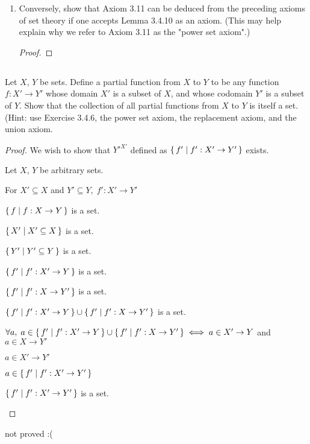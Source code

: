 \documentclass[../../main.tex]{subfiles}
\begin{document}
\begin{enumerate}
    \item 
    \begin{q}
        Conversely, show that Axiom 3.11 can be deduced from the preceding axioms of set theory if one accepts Lemma 3.4.10 as an axiom. (This may help explain why we refer to Axiom 3.11 as the "power set axiom".)
    \end{q}
    
    \begin{proof}
            
    \end{proof}        
\end{enumerate} 

\subsection{}
\begin{q}
    Let $X$, $Y$ be sets. Define a partial function from $X$ to $Y$ to be any function $f : X' \to Y'$ whose domain $X'$ is a subset of $X$, and whose codomain $Y'$ is a subset of $Y$. Show that the collection of all partial functions from $X$ to $Y$ is itself a set. (Hint: use Exercise 3.4.6, the power set axiom, the replacement axiom, and the union axiom.
\end{q}

\begin{proof}
    We wish to show that $Y'^{X'}$ defined as $\{\,f'\mid f' : X' \to Y'\,\}$ exists.
\begin{linebyline}
    \item Let $X$, $Y$ be arbitrary sets.
    \item For $X' \subseteq X$ and $Y' \subseteq Y, \; f' : X' \to Y'$
    \item $\{\,f\mid f : X \to Y\,\}$ is a set. 
    \item $\{\,X'\mid X' \subseteq X\,\}$ is a set. 
    \item $\{\,Y'\mid Y' \subseteq Y\,\}$ is a set. 
    \item 
    \item $\{\,f'\mid f': X' \to Y\,\}$ is a set.
    \item $\{\,f'\mid f': X \to Y'\,\}$ is a set.
    \item $\{\,f'\mid f': X' \to Y\,\} \cup \{\,f'\mid f': X \to Y'\,\}$ is a set. 
    \item $\forall a, \; a \in \{\,f'\mid f': X' \to Y\,\} \cup \{\,f'\mid f': X \to Y'\,\} \iff a \in X' \to Y$ and $a \in X \to Y'$
    \item $a \in X' \to Y'$
    \item $a \in \{\,f'\mid f' : X' \to Y'\,\}$ 
    \item $\{\,f'\mid f' : X' \to Y'\,\}$ is a set.
\end{linebyline}    
\end{proof}
    \begin{xx}
    not proved :(     
    \end{xx}
\end{document}
